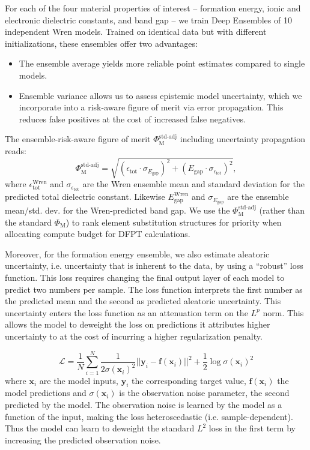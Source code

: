 \documentclass{article}
\newcommand{\fom}[1][]{\Phi_\text{M#1}}
\newcommand{\egap}{{E_\text{gap}}}
\newcommand{\epstot}{\epsilon_\text{tot}}
\begin{document}
For each of the four material properties of interest -- formation energy, ionic and electronic dielectric constants, and band gap -- we train Deep Ensembles \cite{lakshminarayanan_simple_2016} of 10 independent Wren models.
Trained on identical data but with different initializations, these ensembles offer two advantages:
\begin{itemize}
    \item The ensemble average yields more reliable point estimates compared to single models.
    \item Ensemble variance allows us to assess epistemic model uncertainty, which we incorporate into a risk-aware figure of merit via error propagation.
          This reduces false positives at the cost of increased false negatives.
\end{itemize}
The ensemble-risk-aware figure of merit $\fom^\text{std-adj}$ including uncertainty propagation reads:
\begin{equation}
    \fom^\text{std-adj}
    = \sqrt{(\epstot \cdot \sigma_{\egap})^2
        + (E_\text{gap} \cdot \sigma_{\epstot})^2},
\end{equation}
where $\epstot^\text{Wren}$ and $\sigma_{\epstot}$ are the Wren ensemble mean and standard deviation for the predicted total dielectric constant. Likewise $E_\text{gap}^\text{Wren}$ and $\sigma_{\egap}$ are the ensemble mean/std. dev. for the Wren-predicted band gap.
We use the $\fom^\text{std-adj}$ (rather than the standard $\fom$) to rank element substitution structures for priority when allocating compute budget for DFPT calculations.

Moreover, for the formation energy ensemble, we also estimate aleatoric uncertainty, i.e. uncertainty that is inherent to the data, by using a ``robust'' loss function.
This loss requires changing the final output layer of each model to predict two numbers per sample.
The loss function interprets the first number as the predicted mean and the second as predicted aleatoric uncertainty.
This uncertainty enters the loss function as an attenuation term on the $L^p$ norm.
This allows the model to deweight the loss on predictions it attributes higher uncertainty to at the cost of incurring a higher regularization penalty.

\def\f{\mathbf{f}} \def\x{\mathbf{x}} \def\y{\mathbf{y}}
\begin{equation}
    \mathcal{L} = \frac{1}{N} \sum_{i=1}^N \frac{1}{2\sigma(\x_i)^2} ||\y_i - \f(\x_i)||^2 + \frac{1}{2} \log \sigma(\x_i)^2
\end{equation}
where $\x_i$ are the model inputs, $\y_i$ the corresponding target value, $\f(\x_i)$ the model predictions and $\sigma(\x_i)$ is the observation noise parameter, the second predicted by the model.
The observation noise is learned by the model as a function of the input, making the loss heteroscedastic (i.e. sample-dependent).
Thus the model can learn to deweight the standard $L^2$ loss in the first term by increasing the predicted observation noise.
\end{document}
